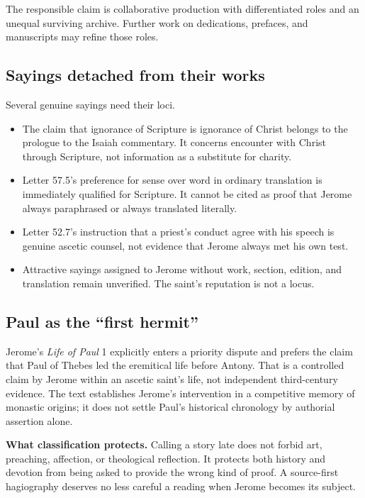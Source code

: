 The responsible claim is collaborative production with differentiated roles
and an unequal surviving archive. Further work on dedications, prefaces, and
manuscripts may refine those roles.

\subsection{Sayings detached from their works}

Several genuine sayings need their loci.

\begin{itemize}
\item The claim that ignorance of Scripture is ignorance of Christ belongs to
the prologue to the Isaiah commentary. It concerns encounter with Christ
through Scripture, not information as a substitute for charity.
\item Letter 57.5's preference for sense over word in ordinary translation is
immediately qualified for Scripture. It cannot be cited as proof that Jerome
always paraphrased or always translated literally.
\item Letter 52.7's instruction that a priest's conduct agree with his speech is
genuine ascetic counsel, not evidence that Jerome always met his own test.
\item Attractive sayings assigned to Jerome without work, section, edition,
and translation remain unverified. The saint's reputation is not a locus.
\end{itemize}

\subsection{Paul as the ``first hermit''}

Jerome's \emph{Life of Paul} 1 explicitly enters a priority dispute and prefers
the claim that Paul of Thebes led the eremitical life before Antony. That is a
controlled claim by Jerome within an ascetic saint's life, not independent
third-century evidence. The text establishes Jerome's intervention in a
competitive memory of monastic origins; it does not settle Paul's historical
chronology by authorial assertion alone.

\begin{studyframe}
\textbf{What classification protects.} Calling a story late does not forbid
art, preaching, affection, or theological reflection. It protects both history
and devotion from being asked to provide the wrong kind of proof. A
source-first hagiography deserves no less careful a reading when Jerome becomes
its subject.
\end{studyframe}
